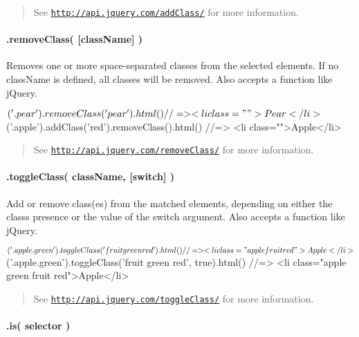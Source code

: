 \begin{quote}
See \href{http://api.jquery.com/addClass/}{\tt http\+://api.\+jquery.\+com/add\+Class/} for more information. \end{quote}


\paragraph*{.remove\+Class( \mbox{[}class\+Name\mbox{]} )}

Removes one or more space-\/separated classes from the selected elements. If no {\ttfamily class\+Name} is defined, all classes will be removed. Also accepts a {\ttfamily function} like j\+Query.


\begin{DoxyCode}
$('.pear').removeClass('pear').html()
//=> <li class="">Pear</li>

$('.apple').addClass('red').removeClass().html()
//=> <li class="">Apple</li>
\end{DoxyCode}


\begin{quote}
See \href{http://api.jquery.com/removeClass/}{\tt http\+://api.\+jquery.\+com/remove\+Class/} for more information. \end{quote}


\paragraph*{.toggle\+Class( class\+Name, \mbox{[}switch\mbox{]} )}

Add or remove class(es) from the matched elements, depending on either the class\textquotesingle{}s presence or the value of the switch argument. Also accepts a {\ttfamily function} like j\+Query.


\begin{DoxyCode}
$('.apple.green').toggleClass('fruit green red').html()
//=> <li class="apple fruit red">Apple</li>

$('.apple.green').toggleClass('fruit green red', true).html()
//=> <li class="apple green fruit red">Apple</li>
\end{DoxyCode}


\begin{quote}
See \href{http://api.jquery.com/toggleClass/}{\tt http\+://api.\+jquery.\+com/toggle\+Class/} for more information. \end{quote}


\paragraph*{.is( selector )}

